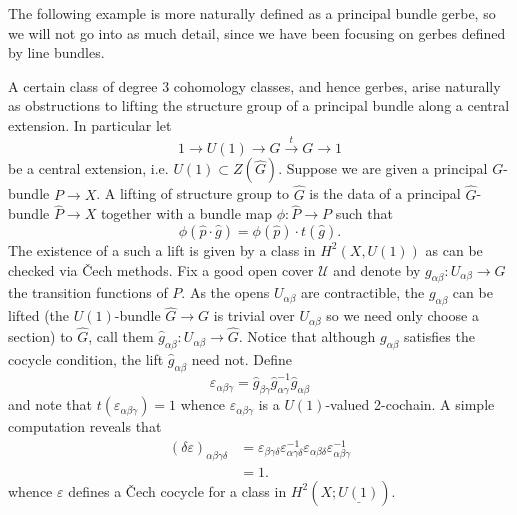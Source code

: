 \documentclass{amsart}
\begin{document}
The following example is more naturally defined as a principal bundle gerbe,
so we will not go into as much detail, since we have been focusing on gerbes
defined by line bundles.
\begin{example}
    A certain class of degree 3 cohomology classes, and hence gerbes, arise naturally
    as obstructions to lifting the structure
    group of a principal bundle along a central extension. In particular let
    \begin{equation*}
        1\to U(1) \to \hat G \xrightarrow{t} G \to 1
    \end{equation*}
    be a central extension, i.e. $U(1)\subset Z(\hat G)$. Suppose we are given a
    principal $G$-bundle $P\to X$. A lifting of structure group to $\hat G$ is the
    data of a principal $\hat G$-bundle $\hat P\to X$ together with a bundle map
    $\phi:\hat P\to P$ such that
    \begin{equation*}
        \phi(\hat p\cdot \hat g)=\phi(\hat p)\cdot t(\hat g).
    \end{equation*}
    The existence of a such a lift is given by a class in $H^2(X, U(1))$ as can be
    checked via \v Cech methods. Fix a good open cover $\mathcal{U}$ and denote by
    $g_{\alpha\beta}:U_{\alpha\beta}\to G$ the transition functions of $P$. As the opens
    $U_{\alpha\beta}$ are contractible, the $g_{\alpha\beta}$ can be lifted (the
    $U(1)$-bundle $\hat G\to G$ is trivial over $U_{\alpha\beta}$ so we need only choose
    a section) to $\hat G$,
    call them $\hat g_{\alpha\beta}:U_{\alpha\beta}\to\hat G$. Notice that although
    $g_{\alpha\beta}$ satisfies the cocycle condition, the lift $\hat g_{\alpha\beta}$
    need not. Define
    \begin{equation*}
        \varepsilon_{\alpha\beta\gamma} = \hat g_{\beta\gamma}\hat g_{\alpha\gamma}^{-1}\hat g_{\alpha\beta}
    \end{equation*}
    and note that $t(\varepsilon_{\alpha\beta\gamma})=1$ whence $\varepsilon_{\alpha\beta\gamma}$ is
    a $U(1)$-valued 2-cochain. A simple computation reveals that
    \begin{align*}
        (\delta\varepsilon)_{\alpha\beta\gamma\delta} &= \varepsilon_{\beta\gamma\delta}\varepsilon_{\alpha\gamma\delta}^{-1}
        \varepsilon_{\alpha\beta\delta}\varepsilon_{\alpha\beta\gamma}^{-1} \\
        &= 1.
    \end{align*}
    whence $\varepsilon$ defines a \v Cech cocycle for a class in $H^2(X; \underline{U(1)})$.

\end{example}
\end{document}
